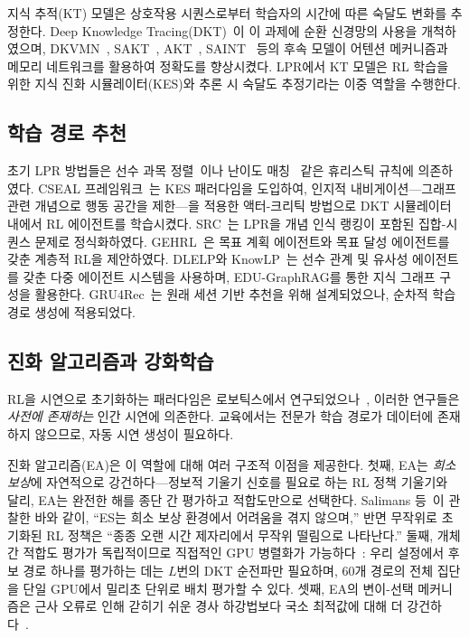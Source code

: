 \documentclass[11pt,a4paper]{article}
\begin{document}
지식 추적(KT) 모델은 상호작용 시퀀스로부터 학습자의 시간에 따른 숙달도 변화를 추정한다. Deep Knowledge Tracing(DKT)~\cite{piech2015dkt}이 이 과제에 순환 신경망의 사용을 개척하였으며, DKVMN~\cite{zhang2017dkvmn}, SAKT~\cite{pandey2019sakt}, AKT~\cite{ghosh2020akt}, SAINT~\cite{choi2020saint} 등의 후속 모델이 어텐션 메커니즘과 메모리 네트워크를 활용하여 정확도를 향상시켰다. LPR에서 KT 모델은 RL 학습을 위한 지식 진화 시뮬레이터(KES)와 추론 시 숙달도 추정기라는 이중 역할을 수행한다.

\subsection{학습 경로 추천}

초기 LPR 방법들은 선수 과목 정렬~\cite{chen2018prerequisite}이나 난이도 매칭~\cite{liu2019cseal} 같은 휴리스틱 규칙에 의존하였다. CSEAL 프레임워크~\cite{liu2019cseal}는 KES 패러다임을 도입하여, 인지적 내비게이션---그래프 관련 개념으로 행동 공간을 제한---을 적용한 액터-크리틱 방법으로 DKT 시뮬레이터 내에서 RL 에이전트를 학습시켰다. SRC~\cite{wang2023src}는 LPR을 개념 인식 랭킹이 포함된 집합-시퀀스 문제로 정식화하였다. GEHRL~\cite{li2023gehrl}은 목표 계획 에이전트와 목표 달성 에이전트를 갖춘 계층적 RL을 제안하였다. DLELP와 KnowLP~\cite{cheng2025knowlp}는 선수 관계 및 유사성 에이전트를 갖춘 다중 에이전트 시스템을 사용하며, EDU-GraphRAG를 통한 지식 그래프 구성을 활용한다. GRU4Rec~\cite{hidasi2016gru4rec}는 원래 세션 기반 추천을 위해 설계되었으나, 순차적 학습 경로 생성에 적용되었다.

\subsection{진화 알고리즘과 강화학습}

RL을 시연으로 초기화하는 패러다임은 로보틱스에서 연구되었으나~\cite{rajeswaran2018dexterous,nair2018demonstrations}, 이러한 연구들은 \emph{사전에 존재하는} 인간 시연에 의존한다. 교육에서는 전문가 학습 경로가 데이터에 존재하지 않으므로, 자동 시연 생성이 필요하다.

진화 알고리즘(EA)은 이 역할에 대해 여러 구조적 이점을 제공한다. 첫째, EA는 \emph{희소 보상}에 자연적으로 강건하다---정보적 기울기 신호를 필요로 하는 RL 정책 기울기와 달리, EA는 완전한 해를 종단 간 평가하고 적합도만으로 선택한다. Salimans 등~\cite{salimans2017es}이 관찰한 바와 같이, ``ES는 희소 보상 환경에서 어려움을 겪지 않으며,'' 반면 무작위로 초기화된 RL 정책은 ``종종 오랜 시간 제자리에서 무작위 떨림으로 나타난다.'' 둘째, 개체 간 적합도 평가가 독립적이므로 직접적인 GPU 병렬화가 가능하다~\cite{wang2026gpuea}: 우리 설정에서 후보 경로 하나를 평가하는 데는 $L$번의 DKT 순전파만 필요하며, 60개 경로의 전체 집단을 단일 GPU에서 밀리초 단위로 배치 평가할 수 있다. 셋째, EA의 변이-선택 메커니즘은 근사 오류로 인해 갇히기 쉬운 경사 하강법보다 국소 최적값에 대해 더 강건하다~\cite{sigaud2023evorl}.
\end{document}
